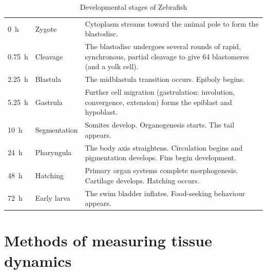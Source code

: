 \begin{table}
  \centering
  \begin{tabular*}{\textwidth}{llp{25em}}
    \SI{0}{\hour} &  Zygote & Cytoplasm streams toward the animal pole to form the blastodisc.\\
    \SI{0.75}{\hour} &  Cleavage & The blastodisc undergoes several rounds of rapid, synchronous, partial cleavage to give 64 blastomeres (and a yolk cell).\\
    \SI{2.25}{\hour} &  Blastula & The midblastula transition occurs. Epiboly begins.\\
    \SI{5.25}{\hour} &  Gastrula & Further cell migration (gastrulation: involution, convergence, extension) forms the epiblast and hypoblast.\\
    \SI{10}{\hour} & Segmentation & Somites develop. Organogenesis starts. The tail appears.\\
    \SI{24}{\hour} & Pharyngula & The body axis straightens. Circulation begins and pigmentation develops. Fins begin development.\\
    \SI{48}{\hour} & Hatching & Primary organ systems complete morphogenesis. Cartilage develops. Hatching occurs.\\
    \SI{72}{\hour} & Early larva & The swim bladder inflates. Food-seeking behaviour appears.
  \end{tabular*}
  \caption{Developmental stages of Zebrafish}
  \label{tab:zfish_dev}
\end{table}

\section{Methods of measuring tissue dynamics}

